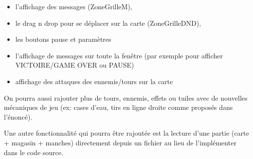 \documentclass{article}
\begin{document}
\begin{itemize}
\item
  l'affichage des messages (ZoneGrilleM),
\item
  le drag n drop pour se déplacer sur la carte (ZoneGrilleDND),
\item
  les boutons pause et paramètres
\item
  l'affichage de messages sur toute la fenêtre (par exemple pour afficher VICTOIRE/GAME OVER ou PAUSE)
\item
  affichage des attaques des ennemis/tours sur la carte
\end{itemize}

On pourra aussi rajouter plus de tours, ennemis, effets ou tuiles avec de nouvelles mécaniques de jeu (ex: cases d'eau, tirs en ligne droite comme proposés dans l'énoncé).

Une autre fonctionnalité qui pourra être rajoutée est la lecture d'une partie (carte + magasin + manches) directement depuis un fichier au lieu de l'implémenter dans le code source.
\end{document}
